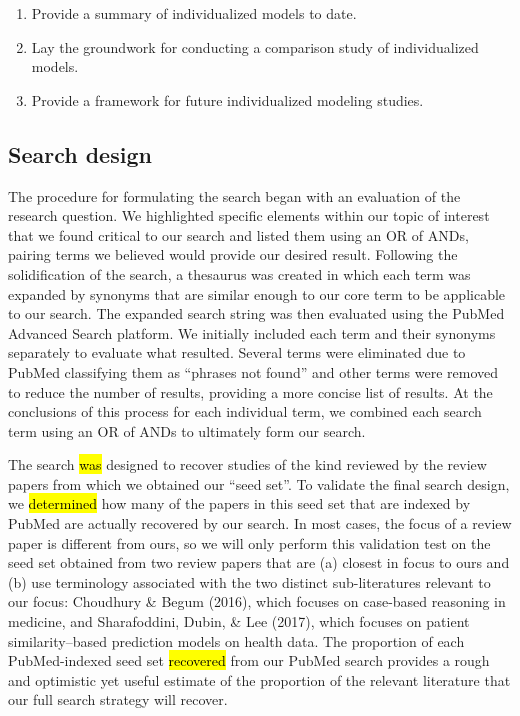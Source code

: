 \documentclass[sn-mathphys,Numbered,pdflatex]{sn-jnl}
\theoremstyle{remark}
\theoremstyle{definition}
\providecommand{\tightlist}{%
  \setlength{\itemsep}{0pt}\setlength{\parskip}{0pt}}
\begin{document}
\begin{enumerate}
\def\labelenumi{\arabic{enumi}.}
\tightlist
\item
  Provide a summary of individualized models to date.
\item
  Lay the groundwork for conducting a comparison study of individualized
  models.
\item
  Provide a framework for future individualized modeling studies.
\end{enumerate}

\subsection*{Search design}\label{search-design}

The procedure for formulating the search began with an evaluation of the
research question. We highlighted specific elements within our topic of
interest that we found critical to our search and listed them using an
OR of ANDs, pairing terms we believed would provide our desired result.
Following the solidification of the search, a thesaurus was created in
which each term was expanded by synonyms that are similar enough to our
core term to be applicable to our search. The expanded search string was
then evaluated using the PubMed Advanced Search platform. We initially
included each term and their synonyms separately to evaluate what
resulted. Several terms were eliminated due to PubMed classifying them
as ``phrases not found'' and other terms were removed to reduce the
number of results, providing a more concise list of results. At the
conclusions of this process for each individual term, we combined each
search term using an OR of ANDs to ultimately form our search.

The search \hl{was} designed to recover studies of the kind reviewed by
the review papers from which we obtained our ``seed set''. To validate
the final search design, we \hl{determined} how many of the papers in
this seed set that are indexed by PubMed are actually recovered by our
search. In most cases, the focus of a review paper is different from
ours, so we will only perform this validation test on the seed set
obtained from two review papers that are (a) closest in focus to ours
and (b) use terminology associated with the two distinct sub-literatures
relevant to our focus: Choudhury \& Begum (2016), which focuses on
case-based reasoning in medicine, and Sharafoddini, Dubin, \& Lee
(2017), which focuses on patient similarity--based prediction models on
health data. The proportion of each PubMed-indexed seed set
\hl{recovered} from our PubMed search provides a rough and optimistic
yet useful estimate of the proportion of the relevant literature that
our full search strategy will recover.
\end{document}
